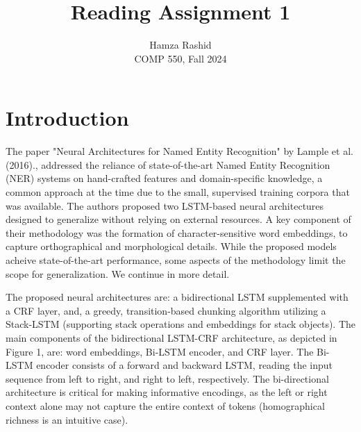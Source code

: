 \documentclass[11pt]{article}
\title{Reading Assignment 1}
\author{Hamza Rashid \\ COMP 550, Fall 2024}
\date{}
\begin{document}
\maketitle
\section*{Introduction}


The paper "Neural Architectures for 
Named Entity Recognition" by Lample et al. (2016)., 
addressed the reliance of state-of-the-art 
Named Entity Recognition (NER) systems on 
hand-crafted  features and domain-specific knowledge, 
a common approach at the time due to the small, 
supervised training corpora that was available. 
The authors proposed two LSTM-based neural 
architectures designed to generalize without 
relying on external resources. A key 
component of their methodology was
the formation of character-sensitive word 
embeddings, to capture orthographical and morphological 
details. While the proposed models acheive 
state-of-the-art performance, some aspects
of the methodology limit the scope for generalization. 
We continue in more detail.


The proposed neural architectures are: a 
bidirectional LSTM supplemented with a CRF layer, and,
a greedy, transition-based chunking algorithm utilizing a Stack-LSTM 
(supporting stack operations and embeddings for stack objects). 
The main components of the bidirectional LSTM-CRF architecture,
as depicted in Figure 1, are: word embeddings, Bi-LSTM encoder, 
and CRF layer. 
The Bi-LSTM encoder consists of a forward and backward 
LSTM, reading the input sequence from left to right, 
and right to left, respectively.
The bi-directional architecture is critical 
for making informative encodings, 
as the left or right context alone 
may not capture the entire context of tokens  
(homographical richness is an intuitive case). 
\end{document}
